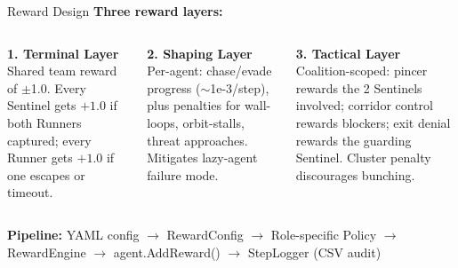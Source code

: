 \documentclass[aspectratio=169,11pt]{beamer}
\begin{document}
\begin{frame}{Reward Design}
\textbf{Three reward layers:}

\vspace{4pt}
\begin{columns}[T]
\textbf{1. Terminal Layer}\\
{\small Shared team reward of $\pm$1.0. Every Sentinel gets $+1.0$ if both Runners captured; every Runner gets $+1.0$ if one escapes or timeout.}

\textbf{2. Shaping Layer}\\
{\small Per-agent: chase/evade progress ($\sim$1e-3/step), plus penalties for wall-loops, orbit-stalls, threat approaches. Mitigates lazy-agent failure mode.}

\textbf{3. Tactical Layer}\\
{\small Coalition-scoped: pincer rewards the 2 Sentinels involved; corridor control rewards blockers; exit denial rewards the guarding Sentinel. Cluster penalty discourages bunching.}
\end{columns}

\vspace{6pt}
\begin{center}
\textbf{Pipeline:} YAML config $\rightarrow$ RewardConfig $\rightarrow$ Role-specific Policy $\rightarrow$ RewardEngine $\rightarrow$ agent.AddReward() $\rightarrow$ StepLogger (CSV audit)
\end{center}
\end{frame}
\end{document}
